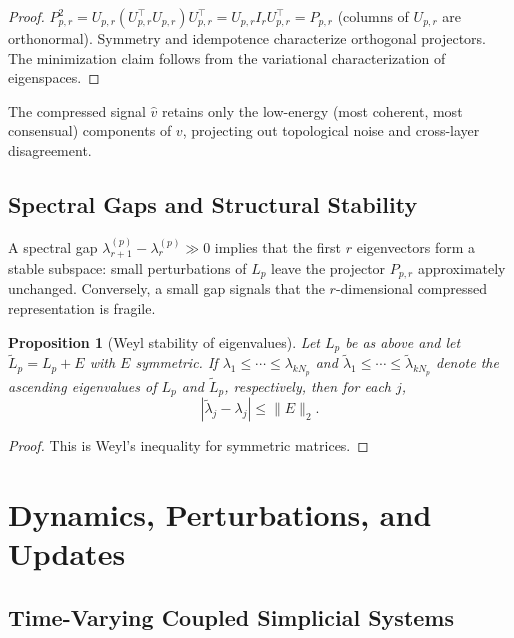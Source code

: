 \documentclass[11pt]{article}
\newtheorem{proposition}[theorem]{Proposition}
\theoremstyle{definition}
\theoremstyle{remark}
\newcommand{\Pp}{P_{p,r}}
\newcommand{\Up}{U_{p,r}}
\newcommand{\vhat}{\hat{v}}
\begin{document}
\begin{proof}
$\Pp^2 = \Up(\Up^\top\Up)\Up^\top = \Up I_r \Up^\top = \Pp$ (columns of $\Up$
are orthonormal). Symmetry and idempotence characterize orthogonal projectors.
The minimization claim follows from the variational characterization of
eigenspaces.
\end{proof}

The compressed signal $\vhat$ retains only the low-energy (most coherent,
most consensual) components of $v$, projecting out topological noise and
cross-layer disagreement.

\subsection{Spectral Gaps and Structural Stability}

A spectral gap $\lambda_{r+1}^{(p)}-\lambda_r^{(p)}\gg 0$ implies that the
first $r$ eigenvectors form a stable subspace: small perturbations of $L_p$
leave the projector $\Pp$ approximately unchanged. Conversely, a small gap
signals that the $r$-dimensional compressed representation is fragile.

\begin{proposition}[Weyl stability of eigenvalues]
\label{prop:weyl}
Let $L_p$ be as above and let $\widetilde{L}_p=L_p+E$ with $E$ symmetric. If
$\lambda_1\le\cdots\le\lambda_{kN_p}$ and
$\tilde{\lambda}_1\le\cdots\le\tilde{\lambda}_{kN_p}$ denote the ascending
eigenvalues of $L_p$ and $\widetilde{L}_p$, respectively, then for each $j$,
\[
|\tilde{\lambda}_j-\lambda_j|\le \|E\|_2.
\]
\end{proposition}

\begin{proof}
This is Weyl's inequality for symmetric matrices.
\end{proof}


\section{Dynamics, Perturbations, and Updates}
\label{sec:dynamics}

\subsection{Time-Varying Coupled Simplicial Systems}
\end{document}
